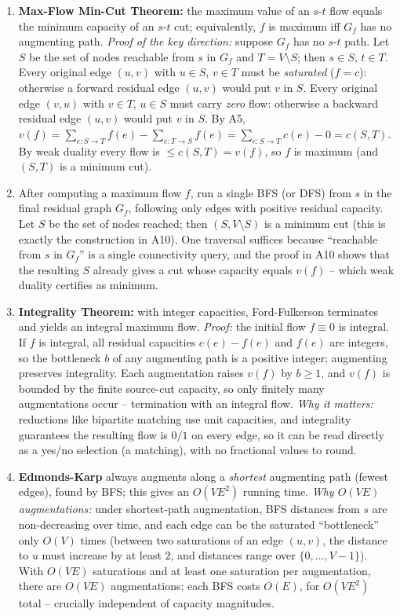 \documentclass[11pt]{article}
\begin{document}
\begin{enumerate}[label=\textbf{A\arabic*.}, leftmargin=2.2em]
\item \textbf{Max-Flow Min-Cut Theorem:} the maximum value of an $s$-$t$ flow equals the
minimum capacity of an $s$-$t$ cut; equivalently, $f$ is maximum iff $G_f$ has no
augmenting path. \emph{Proof of the key direction:} suppose $G_f$ has no $s$-$t$ path. Let
$S$ be the set of nodes reachable from $s$ in $G_f$ and $T = V\setminus S$; then $s\in S$,
$t\in T$. Every original edge $(u,v)$ with $u\in S$, $v\in T$ must be \emph{saturated}
($f=c$): otherwise a forward residual edge $(u,v)$ would put $v$ in $S$. Every original
edge $(v,u)$ with $v\in T$, $u\in S$ must carry \emph{zero} flow: otherwise a backward
residual edge $(u,v)$ would put $v$ in $S$. By A5, $v(f) = \sum_{e:S\to T} f(e) -
\sum_{e:T\to S} f(e) = \sum_{e:S\to T} c(e) - 0 = c(S,T)$. By weak duality every flow is
$\le c(S,T) = v(f)$, so $f$ is maximum (and $(S,T)$ is a minimum cut).

\item After computing a maximum flow $f$, run a single BFS (or DFS) from $s$ in the final
residual graph $G_f$, following only edges with positive residual capacity. Let $S$ be the
set of nodes reached; then $(S, V\setminus S)$ is a minimum cut (this is exactly the
construction in A10). One traversal suffices because ``reachable from $s$ in $G_f$'' is a
single connectivity query, and the proof in A10 shows that the resulting $S$ already gives
a cut whose capacity equals $v(f)$ -- which weak duality certifies as minimum.

\item \textbf{Integrality Theorem:} with integer capacities, Ford-Fulkerson terminates
and yields an integral maximum flow. \emph{Proof:} the initial flow $f\equiv0$ is integral.
If $f$ is integral, all residual capacities $c(e)-f(e)$ and $f(e)$ are integers, so the
bottleneck $b$ of any augmenting path is a positive integer; augmenting preserves
integrality. Each augmentation raises $v(f)$ by $b\ge1$, and $v(f)$ is bounded by the
finite source-cut capacity, so only finitely many augmentations occur -- termination with
an integral flow. \emph{Why it matters:} reductions like bipartite matching use unit
capacities, and integrality guarantees the resulting flow is $0/1$ on every edge, so it can
be read directly as a yes/no selection (a matching), with no fractional values to round.

\item \textbf{Edmonds-Karp} always augments along a \emph{shortest} augmenting path (fewest
edges), found by BFS; this gives an $O(VE^2)$ running time. \emph{Why $O(VE)$
augmentations:} under shortest-path augmentation, BFS distances from $s$ are
non-decreasing over time, and each edge can be the saturated ``bottleneck'' only $O(V)$
times (between two saturations of an edge $(u,v)$, the distance to $u$ must increase by at
least $2$, and distances range over $\{0,\dots,V-1\}$). With $O(VE)$ saturations and at
least one saturation per augmentation, there are $O(VE)$ augmentations; each BFS costs
$O(E)$, for $O(VE^2)$ total -- crucially independent of capacity magnitudes.


\end{enumerate}
\end{document}
